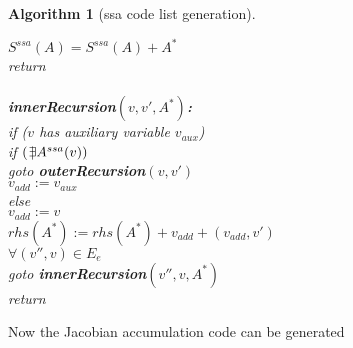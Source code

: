 \documentclass{book}
\newcommand{\notexists}{{ \kern .2em | \kern -.4em \exists }}
\newtheorem{Alg}{Algorithm}
\begin{document}
\begin{Alg}[ssa code list generation]
\begin{tabbing}
\>\> $S^{ssa}(A)=S^{ssa}(A)+A^*$ \\
\> return \\
\\
{\bf innerRecursion$(v,v',A^*)$:}\\
\> if ($v$ has auxiliary variable $v_{aux}$) \\
\>\> if $(\notexists A^{ssa}(v))$\\
\>\>\> goto {\bf outerRecursion}$(v,v')$ \\
\>\> $v_{add}:=v_{aux}$\\
\> else \\
\>\> $v_{add}:=v$\\
\> $rhs(A^*):=rhs(A^*)+v_{add} + (v_{add},v')$\\  
\>\> $\forall (v'',v)\in E_e$ \\
\>\>\> goto {\bf innerRecursion}$(v'',v,A^*)$ \\ 
\> return \\
\end{tabbing}
\end{Alg}

Now the Jacobian accumulation code can be generated 
\end{document}

